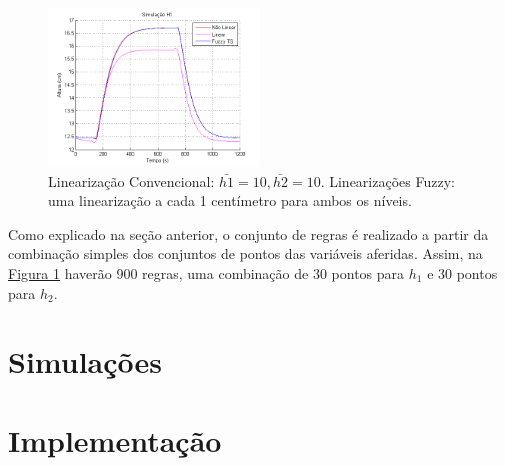 \begin{figure}[H]
	\includegraphics[width=0.5\textwidth]{img/h1Fuz_1to30.png}
	\caption{\small Linearização Convencional: $ \bar{h1}=10, \bar{h2}=10$. Linearizações Fuzzy: uma linearização a cada 1 centímetro para ambos os níveis.}
	\label{figH1FNM_4}
\end{figure}

Como explicado na seção anterior, o conjunto de regras é realizado a partir da combinação simples dos conjuntos de pontos das variáveis aferidas. Assim, na \hyperref[figH1FNM_4]{Figura \ref{figH1FNM_4}} haverão 900 regras, uma combinação de 30 pontos para $h_1$ e 30 pontos para $h_2$.

\section{Simulações}

\section{Implementação}

%

